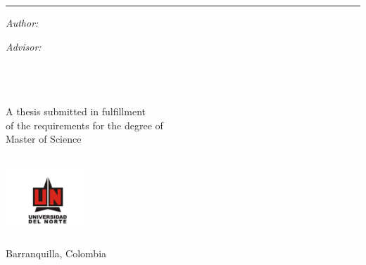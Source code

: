 \begin{titlepage}
  \doublespacing
  \large
  \hfill
  \vfill
  \vspace*{0.5cm}
  \begin{center}
    \doublespacing
    \textcolor{black}{\huge\textbf{\myTitle}}
  \end{center}
  \vspace{1.25cm}
  \hrule
  \vspace{1.5cm}
  \onehalfspacing
  \begin{center}

    \begin{minipage}[t]{0.5\textwidth}
      \begin{flushleft}
        \emph{Author:}\\
        {{\myFirstName} \textsc{\myLastName}}
      \end{flushleft}
    \end{minipage}
    \begin{minipage}[t]{0.4\textwidth}
      \begin{flushright}
        \emph{Advisor:} \\
        { {\myProfFirstName} \textsc{\myProfLastName}{\myProfTitle}}\\
        { {\myOtherProfFirstName} \textsc{\myOtherProfLastName}{\myOtherProfTitle}}\\
      \end{flushright}
    \end{minipage}\\[1.5cm]
    
    A thesis submitted in fulfillment\\
    of the requirements for the degree of\\
    {Master of Science}\\[1cm]
    
    \myDepartment\\

    \hfill
    \vfill

    \includegraphics[width=3cm]{figures/UN-logo.pdf}\\
    \href{https://latrobe.edu.au}{\myUni}\\
    Barranquilla, Colombia\\[2em]
    {\mySubmissionMonth} {\mySubmissionYear}
  \end{center}
\end{titlepage}
